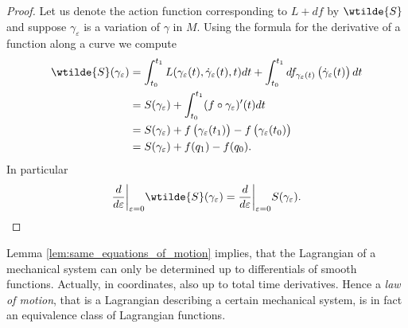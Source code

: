 \begin{proof}
	Let us denote the action function corresponding to $L + df$ by $\wtilde{S}$ and suppose $\gamma_\varepsilon$ is a variation of $\gamma$ in $M$. Using the formula for the derivative of a function along a curve \cite[283]{lee:smooth_manifolds:2013} we compute
	\begin{align*}
		\wtilde{S}(\gamma_\varepsilon) &= \int_{t_0}^{t_1}L(\gamma_\varepsilon(t),\dot{\gamma}_\varepsilon(t),t)dt + \int_{t_0}^{t_1}df_{\gamma_\varepsilon(t)}\del[1]{\dot{\gamma}_\varepsilon(t)}dt\\
		&= S(\gamma_\varepsilon) + \int_{t_0}^{t_1}(f \circ \gamma_\varepsilon)'(t)dt\\
		&= S(\gamma_\varepsilon) + f\del[1]{\gamma_\varepsilon(t_1)} - f\del[1]{\gamma_{\varepsilon}(t_0)}\\
		&= S(\gamma_\varepsilon) + f(q_1) - f(q_0).
	\end{align*}
	In particular
	\begin{equation*}
		\frac{d}{d\varepsilon}\bigg\vert_{\varepsilon = 0}\wtilde{S}(\gamma_\varepsilon) = \frac{d}{d\varepsilon}\bigg\vert_{\varepsilon = 0}S(\gamma_\varepsilon).
	\end{equation*}
\end{proof}

\begin{remark}
	Lemma \ref{lem:same_equations_of_motion} implies, that the Lagrangian of a mechanical system can only be determined up to differentials of smooth functions. Actually, in coordinates, also up to total time derivatives. Hence a \emph{law of motion}, that is a Lagrangian describing a certain mechanical system, is in fact an equivalence class of Lagrangian functions.
\end{remark}
